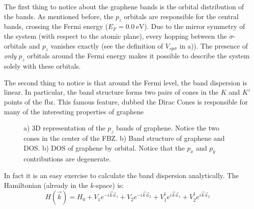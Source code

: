 The first thing to notice about the graphene bands is the orbital distribution of the bands. As mentioned before, the $p_z$ orbitals are responsible for the central bands, crossing the Fermi energy ($E_F=\SI{0.0}{\eV}$). Due to the mirror symmetry of the system (with respect to the atomic plane), every hopping between the $\sigma$-orbitals and $p_z$ vanishes exactly (see the definition of $V_{sp\sigma}$ in a)).
The presence of \textit{only} $p_z$ orbitals around the Fermi energy makes it possible to describe the system solely with these orbitals.

The second thing to notice is that around the Fermi level, the band dispersion is linear. In particular, the band structure forms two pairs of cones in the $K$ and $K'$ points of the \ac{fbz}. This famous feature, dubbed the Dirac Cones %
is responsible for many of the interesting properties of graphene %
\begin{figure}[!ht]
\begin{center}
\end{center}
\vspace{-15pt}
\caption{a) 3D representation of the $p_z$ bands of graphene. Notice the two cones in the center of the FBZ. b) Band structure of graphene and DOS. b) DOS of graphene by orbital. Notice that the $p_x$ and $p_y$ contributions are degenerate.}
\label{bandsG}
\end{figure}
\FloatBarrier
In fact it is an easy exercise to calculate the band dispersion analytically. The Hamiltonian (already in the $k$-space) is:
\begin{equation}
   H(\vec{k}) = H_0 + V_1 e^{-i\vec{k}\vec{a}_1} + V_2 e^{-i\vec{k}\vec{a}_2}+
   V^{\dagger}_1 e^{i\vec{k}\vec{a}_1} + V^{\dagger}_2 e^{i\vec{k}\vec{a}_2}
\label{hk}
\end{equation}
